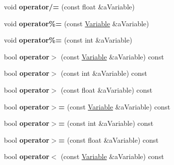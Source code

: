 \begin{DoxyCompactItemize}
\item 
\hypertarget{a00027_abcb80a08c60c33570933c89214684028}{void {\bfseries operator/=} (const float \&a\+Variable)}\label{a00027_abcb80a08c60c33570933c89214684028}

\item 
\hypertarget{a00027_a4bd7a3b7aa71b11670fcf8e296cf0fdf}{void {\bfseries operator\%=} (const \hyperlink{a00027}{Variable} \&a\+Variable)}\label{a00027_a4bd7a3b7aa71b11670fcf8e296cf0fdf}

\item 
\hypertarget{a00027_a627ab13fe2bd0eb446e5ae375fa38fa4}{void {\bfseries operator\%=} (const int \&a\+Variable)}\label{a00027_a627ab13fe2bd0eb446e5ae375fa38fa4}

\item 
\hypertarget{a00027_acba93d650c9836d3e9c8cff9187fe796}{bool {\bfseries operator$>$} (const \hyperlink{a00027}{Variable} \&a\+Variable) const }\label{a00027_acba93d650c9836d3e9c8cff9187fe796}

\item 
\hypertarget{a00027_af08d02bb113bb86dd834fa4d8dd2f1c6}{bool {\bfseries operator$>$} (const int \&a\+Variable) const }\label{a00027_af08d02bb113bb86dd834fa4d8dd2f1c6}

\item 
\hypertarget{a00027_a9f41035d7fe454337e150f17ec82a7d8}{bool {\bfseries operator$>$} (const float \&a\+Variable) const }\label{a00027_a9f41035d7fe454337e150f17ec82a7d8}

\item 
\hypertarget{a00027_a8b9805a6248f2ae3628a130bdbefa7d4}{bool {\bfseries operator$>$=} (const \hyperlink{a00027}{Variable} \&a\+Variable) const }\label{a00027_a8b9805a6248f2ae3628a130bdbefa7d4}

\item 
\hypertarget{a00027_a7039b8a279eda6c99d05e30a5cf8d52f}{bool {\bfseries operator$>$=} (const int \&a\+Variable) const }\label{a00027_a7039b8a279eda6c99d05e30a5cf8d52f}

\item 
\hypertarget{a00027_aec9f1b2fb385976327e945df5713b75c}{bool {\bfseries operator$>$=} (const float \&a\+Variable) const }\label{a00027_aec9f1b2fb385976327e945df5713b75c}

\item 
\hypertarget{a00027_ab3f60f12efcd38436379ca2e94503e97}{bool {\bfseries operator$<$} (const \hyperlink{a00027}{Variable} \&a\+Variable) const }\label{a00027_ab3f60f12efcd38436379ca2e94503e97}


\end{DoxyCompactItemize}

